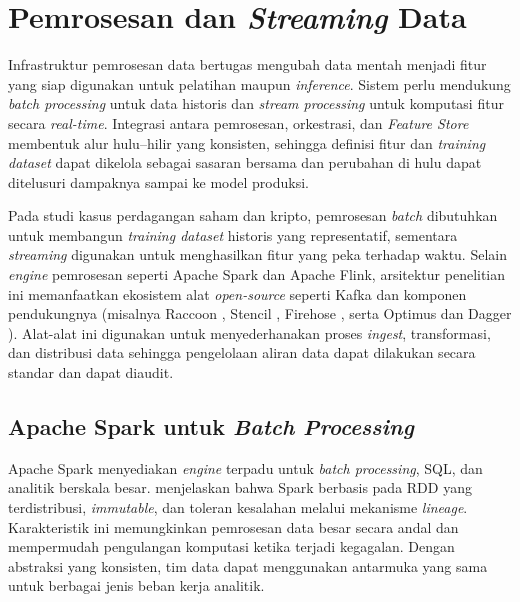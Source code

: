 \section{Pemrosesan dan \textit{Streaming} Data}
\label{sec:data_processing}

Infrastruktur pemrosesan data bertugas mengubah data mentah menjadi fitur yang siap digunakan untuk pelatihan maupun \textit{inference}. Sistem perlu mendukung \textit{batch processing} untuk data historis dan \textit{stream processing} untuk komputasi fitur secara \textit{real-time}. Integrasi antara pemrosesan, orkestrasi, dan \textit{Feature Store} membentuk alur hulu--hilir yang konsisten, sehingga definisi fitur dan \textit{training dataset} dapat dikelola sebagai sasaran bersama dan perubahan di hulu dapat ditelusuri dampaknya sampai ke model produksi.

Pada studi kasus perdagangan saham dan kripto, pemrosesan \textit{batch} dibutuhkan untuk membangun \textit{training dataset} historis yang representatif, sementara \textit{streaming} digunakan untuk menghasilkan fitur yang peka terhadap waktu. Selain \textit{engine} pemrosesan seperti Apache Spark dan Apache Flink, arsitektur penelitian ini memanfaatkan ekosistem alat \textit{open-source} seperti Kafka dan komponen pendukungnya (misalnya Raccoon \autocite{raystack2025raccoon}, Stencil \autocite{raystack2025stencil}, Firehose \autocite{raystack2025firehose}, serta Optimus dan Dagger \autocite{raystack2025optimus,raystack2025dagger}). Alat-alat ini digunakan untuk menyederhanakan proses \textit{ingest}, transformasi, dan distribusi data sehingga pengelolaan aliran data dapat dilakukan secara standar dan dapat diaudit.

\subsection{Apache Spark untuk \textit{Batch Processing}}
\label{sec:spark}

Apache Spark menyediakan \textit{engine} terpadu untuk \textit{batch processing}, SQL, dan analitik berskala besar. \textcite{zaharia2016spark} menjelaskan bahwa Spark berbasis pada RDD yang terdistribusi, \textit{immutable}, dan toleran kesalahan melalui mekanisme \textit{lineage}. Karakteristik ini memungkinkan pemrosesan data besar secara andal dan mempermudah pengulangan komputasi ketika terjadi kegagalan. Dengan abstraksi yang konsisten, tim data dapat menggunakan antarmuka yang sama untuk berbagai jenis beban kerja analitik.

